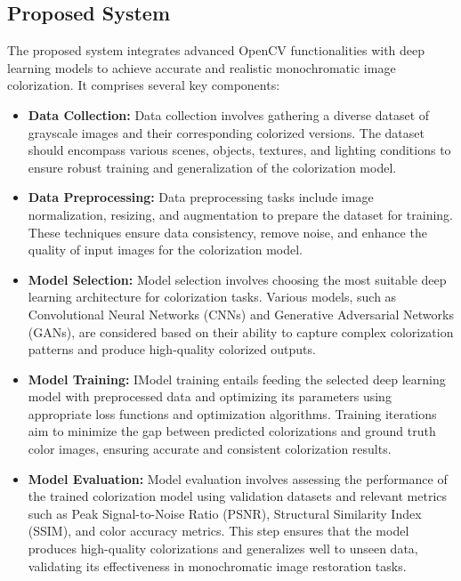 \subsection{Proposed System}
The proposed system integrates advanced OpenCV functionalities with deep learning models to achieve accurate and realistic monochromatic image colorization. It comprises several key components:
\begin{itemize}
    \item \textbf{Data Collection:} Data collection involves gathering a diverse dataset of grayscale images and their corresponding colorized versions. The dataset should encompass various scenes, objects, textures, and lighting conditions to ensure robust training and generalization of the colorization model.

    \item \textbf{Data Preprocessing:} Data preprocessing tasks include image normalization, resizing, and augmentation to prepare the dataset for training. These techniques ensure data consistency, remove noise, and enhance the quality of input images for the colorization model.
    
    \item \textbf{Model Selection:} Model selection involves choosing the most suitable deep learning architecture for colorization tasks. Various models, such as Convolutional Neural Networks (CNNs) and Generative Adversarial Networks (GANs), are considered based on their ability to capture complex colorization patterns and produce high-quality colorized outputs.
    \item \textbf{Model Training:} IModel training entails feeding the selected deep learning model with preprocessed data and optimizing its parameters using appropriate loss functions and optimization algorithms. Training iterations aim to minimize the gap between predicted colorizations and ground truth color images, ensuring accurate and consistent colorization results.
    \item \textbf{Model Evaluation:} Model evaluation involves assessing the performance of the trained colorization model using validation datasets and relevant metrics such as Peak Signal-to-Noise Ratio (PSNR), Structural Similarity Index (SSIM), and color accuracy metrics. This step ensures that the model produces high-quality colorizations and generalizes well to unseen data, validating its effectiveness in monochromatic image restoration tasks.
\end{itemize}

